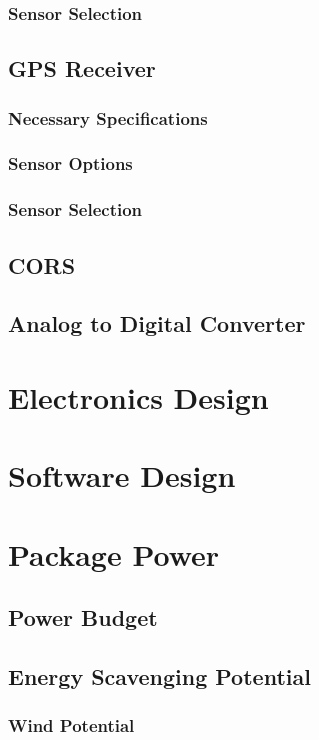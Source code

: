 \documentclass[12pt]{report}
\begin{document}
			\subsubsection{Sensor Selection}
		\subsection{GPS Receiver}			
			\subsubsection{Necessary Specifications}
			\subsubsection{Sensor Options}
			\subsubsection{Sensor Selection}
			\newpage
		\subsection{CORS}
		\subsection{Analog to Digital Converter}
			
	\section{Electronics Design}
			
			
	\section{Software Design}
	\section{Package Power}
		\subsection{Power Budget}
		\subsection{Energy Scavenging Potential}
			\subsubsection{Wind Potential}
\end{document}
